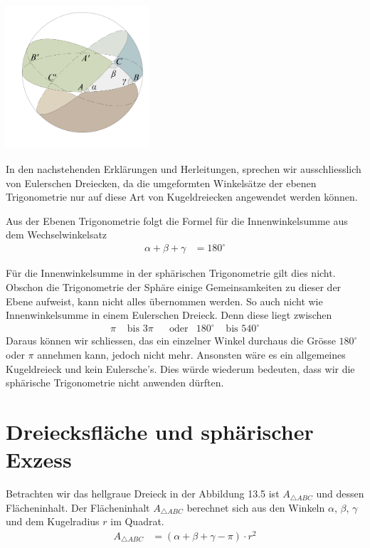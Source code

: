 \begin{refsection}
\begin{refsection}
\begin{center}
        \includegraphics[width=0.4\textwidth]{kugel/_Eulersches.jpg}
\end{center}

In den nachstehenden Erklärungen und Herleitungen, sprechen wir ausschliesslich von Eulerschen Dreiecken, da die umgeformten Winkelsätze der ebenen Trigonometrie nur auf diese Art von Kugeldreiecken angewendet werden können.

Aus der Ebenen Trigonometrie folgt die Formel für die Innenwinkelsumme aus dem Wechselwinkelsatz
\begin{align*}
\alpha + \beta + \gamma &= 180^{\circ}
\end{align*}

Für die Innenwinkelsumme in der sphärischen Trigonometrie gilt dies nicht. Obschon die Trigonometrie der Sphäre einige Gemeinsamkeiten zu dieser der Ebene aufweist, kann nicht alles übernommen werden.
So auch nicht wie Innenwinkelsumme in einem Eulerschen Dreieck.
Denn diese liegt zwischen
\[
\begin{aligned}
\pi
&\text{ bis }
3\pi
&
&\text{oder}
&
180^{\circ}
&\text{ bis }
540^{\circ}
\end{aligned}
\]
Daraus können wir schliessen, das ein einzelner Winkel durchaus die Grösse $180^{\circ}$ oder $\pi$ annehmen kann, jedoch nicht mehr. Ansonsten wäre es ein allgemeines Kugeldreieck und kein Eulersche’s. Dies würde wiederum bedeuten, dass wir die sphärische Trigonometrie nicht anwenden dürften.



\section{Dreiecksfläche und sphärischer Exzess} \label{Flaeche} 
Betrachten wir das hellgraue Dreieck in der Abbildung 13.5 ist $A_{ \triangle{ ABC }}$ und dessen Flächeninhalt. Der Flächeninhalt $A_{ \triangle{ ABC }}$ berechnet sich aus den Winkeln $\alpha$, $\beta$, $\gamma$ und dem Kugelradius $r$ im Quadrat.
\begin{align*}
A_{ \triangle{ ABC }} &= (\alpha + \beta + \gamma - \pi) \cdot r^2
\end{align*}


\end{refsection}
\end{refsection}
